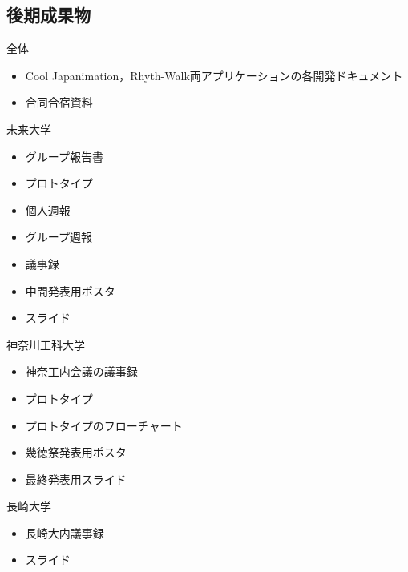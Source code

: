 \subsection{後期成果物}

全体
\begin{itemize}
\item Cool Japanimation，Rhyth-Walk両アプリケーションの各開発ドキュメント
\item 合同合宿資料　
\end{itemize}
未来大学
\begin{itemize}
\item グループ報告書
\item プロトタイプ
\item 個人週報
\item グループ週報
\item 議事録
\item 中間発表用ポスタ
\item スライド
\end{itemize}
神奈川工科大学
\begin{itemize}
\item 神奈工内会議の議事録
\item プロトタイプ
\item プロトタイプのフローチャート
\item 幾徳祭発表用ポスタ
\item 最終発表用スライド
\end{itemize}
長崎大学
\begin{itemize}
\item 長崎大内議事録
\item スライド
\end{itemize}
